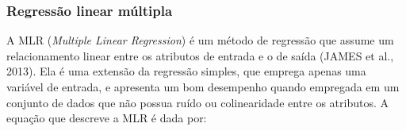 




\subsubsection{Regressão linear múltipla}

A MLR (\textit{Multiple Linear Regression}) é um método de regressão que assume um relacionamento linear entre os atributos de entrada e o de saída (JAMES et al., 2013). Ela é uma extensão da regressão simples, que emprega apenas uma variável de entrada, e apresenta um bom desempenho quando empregada em um conjunto de dados que não possua ruído ou colinearidade entre os atributos. A equação que descreve a MLR é dada por:

